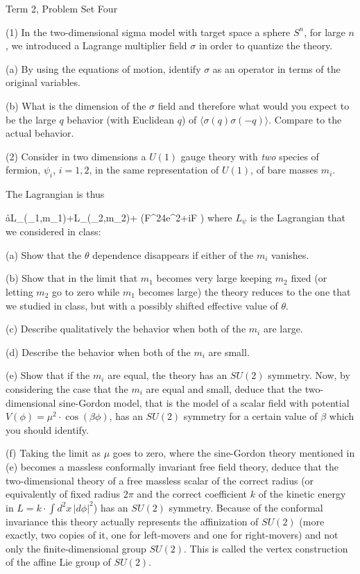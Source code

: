 

\def\bar{\overline}
Term 2, Problem Set Four

(1) In the two-dimensional sigma model with target space a sphere $S^n$,
for large $n$, we introduced a Lagrange multiplier field $\sigma$ in
order to quantize the theory.

(a) By using the equations of motion, identify $\sigma$ as an operator in 
terms of the original variables.

(b) What is the dimension of the $\sigma$ field and therefore what
would you expect to be the large $q$ behavior (with Euclidean $q$)
of $\langle \sigma(q)\sigma(-q)\rangle$.  Compare to the actual behavior.

(2) Consider in two dimensions a $U(1)$ gauge theory with {\it two}
species of fermion, $\psi_i$, $i=1,2$, in the same representation of
$U(1)$, of bare masses $m_i$.

The Lagrangian is thus

\eqn\aa{L_\psi(\psi_1,m_1)+L_\psi(\psi_2,m_2)+
\int\left({F^2\over 4e^2}+i{F\pi}
\right)}
where $L_\psi$ is the Lagrangian that we considered in class:
\eqn\bb{L_\psi(\psi,m)=\int\left(\bar\psi_+D_-\psi_++\bar\psi_-D_+\psi_-
+m\bar\psi_-\psi_++\bar m \bar\psi_+\psi_-\right)d^2x.}


(a) Show that the $\theta$ dependence disappears if either of the $m_i$
vanishes.

(b) Show that in the limit that $m_1$ becomes very large keeping $m_2$
fixed (or letting $m_2$ go to zero while $m_1$ becomes large) 
the theory reduces to the one that we studied in class, but
with a possibly shifted effective value of $\theta$.  

(c) Describe qualitatively the behavior when both of the $m_i$
are large.

(d) Describe the behavior when both of the $m_i$ are small.

(e) Show that if the $m_i$ are equal, the theory has an $SU(2)$
symmetry.  Now, by considering the case that the $m_i$ are equal and small,
deduce that the two-dimensional sine-Gordon model, that is the model
of a scalar field with potential $V(\phi)=\mu^2\cdot\cos(\beta\phi)$,
has an $SU(2)$ symmetry  for a certain value of $\beta$ which you should
identify.

(f) Taking the limit as $\mu$ goes to zero, where the sine-Gordon theory
mentioned in (e) becomes a massless conformally invariant free field theory,
deduce that the two-dimensional theory of a free massless scalar of the
correct radius (or equivalently
of fixed radius $2\pi$ and the correct coefficient $k$
of the kinetic energy in $L=k\cdot \int d^2x  \,|d\phi|^2$)
has an $SU(2)$ symmetry.  Because of the conformal invariance
this theory actually represents  the affinization of $SU(2)$ (more
exactly, two copies of it, one for left-movers and one for right-movers)
and not only the finite-dimensional group $SU(2)$.  This is called
the vertex construction of the affine Lie group of $SU(2)$.

